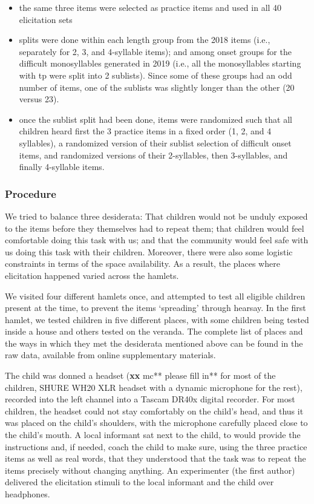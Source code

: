 \documentclass[english,,man,floatsintext]{apa6}
\providecommand{\tightlist}{%
  \setlength{\itemsep}{0pt}\setlength{\parskip}{0pt}}
\begin{document}
\begin{itemize}
\tightlist
\item
  the same three items were selected as practice items and used in all
  40 elicitation sets
\item
  splits were done within each length group from the 2018 items (i.e.,
  separately for 2, 3, and 4-syllable items); and among onset groups for
  the difficult monosyllables generated in 2019 (i.e., all the
  monosyllables starting with tp were split into 2 sublists). Since some
  of these groups had an odd number of items, one of the sublists was
  slightly longer than the other (20 versus 23).
\item
  once the sublist split had been done, items were randomized such that
  all children heard first the 3 practice items in a fixed order (1, 2,
  and 4 syllables), a randomized version of their sublist selection of
  difficult onset items, and randomized versions of their 2-syllables,
  then 3-syllables, and finally 4-syllable items.
\end{itemize}

\subsubsection{Procedure}\label{procedure}

We tried to balance three desiderata: That children would not be unduly
exposed to the items before they themselves had to repeat them; that
children would feel comfortable doing this task with us; and that the
community would feel safe with us doing this task with their children.
Moreover, there were also some logistic constraints in terms of the
space availability. As a result, the places where elicitation happened
varied across the hamlets.

We visited four different hamlets once, and attempted to test all
eligible children present at the time, to prevent the items `spreading'
through hearsay. In the first hamlet, we tested children in five
different places, with some children being tested inside a house and
others tested on the veranda. The complete list of places and the ways
in which they met the desiderata mentioned above can be found in the raw
data, available from online supplementary materials.

The child was donned a headset (\textbf{xx }mc** please fill in** for
most of the children, SHURE WH20 XLR headset with a dynamic microphone
for the rest), recorded into the left channel into a Tascam DR40x
digital recorder. For most children, the headset could not stay
comfortably on the child's head, and thus it was placed on the child's
shoulders, with the microphone carefully placed close to the child's
mouth. A local informant sat next to the child, to would provide the
instructions and, if needed, coach the child to make sure, using the
three practice items as well as real words, that they understood that
the task was to repeat the items precisely without changing anything. An
experimenter (the first author) delivered the elicitation stimuli to the
local informant and the child over headphones.
\end{document}
